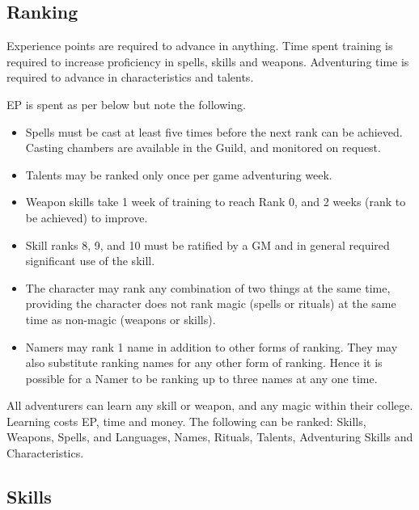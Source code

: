 \begin{multicols}{3}

\section{Ranking}

Experience points are required to advance in anything.  Time spent
training is required to increase proficiency in spells, skills and
weapons.  Adventuring time is required to advance in characteristics
and talents.

EP is spent as per below but note the following.
\begin{itemize}

\item
Spells must be cast at least five times before the next rank can be
achieved.  Casting chambers are available in the Guild, and monitored
on request.

\item
Talents may be ranked only once per game adventuring week.

\item
Weapon skills take 1 week of training to reach Rank 0, and 2 weeks \x
(rank to be achieved) to improve.

\item
Skill ranks 8, 9, and 10 must be ratified by a GM and in general
required significant use of the skill.

\item
The character may rank any combination of two things at the same time,
providing the character does not rank magic (\ie spells or rituals)
at the same time as non-magic (\ie weapons or skills).

\item
Namers may rank 1 name in addition to other forms of ranking.  They
may also substitute ranking names for any other form of ranking.
Hence it is possible for a Namer to be ranking up to three names at
any one time.

\end{itemize}

All adventurers can learn any skill or weapon, and any magic within
their college. Learning costs EP, time and money.  The following can
be ranked: Skills, Weapons, Spells, and Languages, Names, Rituals,
Talents, Adventuring Skills and Characteristics.

\subsection{Skills}


\end{multicols}
